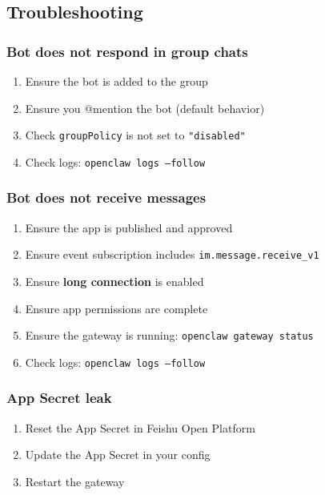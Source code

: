 \hrulefill


\subsection{Troubleshooting}


\subsubsection{Bot does not respond in group chats}


\begin{enumerate}
  \item Ensure the bot is added to the group
  \item Ensure you @mention the bot (default behavior)
  \item Check \texttt{groupPolicy} is not set to \texttt{"disabled"}
  \item Check logs: \texttt{openclaw logs --follow}
\end{enumerate}


\subsubsection{Bot does not receive messages}


\begin{enumerate}
  \item Ensure the app is published and approved
  \item Ensure event subscription includes \texttt{im.message.receive\_v1}
  \item Ensure \textbf{long connection} is enabled
  \item Ensure app permissions are complete
  \item Ensure the gateway is running: \texttt{openclaw gateway status}
  \item Check logs: \texttt{openclaw logs --follow}
\end{enumerate}


\subsubsection{App Secret leak}


\begin{enumerate}
  \item Reset the App Secret in Feishu Open Platform
  \item Update the App Secret in your config
  \item Restart the gateway
\end{enumerate}


